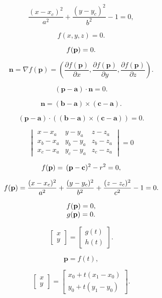 \documentclass[lang=cn,12pt]{elegantbook}
\begin{document}
$$
  {\frac{(x-x_{c})^{2}}{a^{2}}}+{\frac{(y-y_{c})^{2}}{b^{2}}}-1=0,
$$

$$
  f(x,y,z)=0.
$$

$$
  f({\bf p})=0.
$$

$$
  \mathbf{n}=\nabla f(\mathbf{p})=\left({\frac{\partial f(\mathbf{p})}{\partial x}},{\frac{\partial f(\mathbf{p})}{\partial y}},{\frac{\partial f(\mathbf{p})}{\partial z}}\right).
$$

\begin{equation}
  (\mathbf{p}-\mathbf{a})\cdot\mathbf{n}=0.
\end{equation}

$$
  \mathbf{n}=(\mathbf{b}-\mathbf{a})\times(\mathbf{c}-\mathbf{a}).
$$

\begin{equation}
  (\mathbf{p}-\mathbf{a})\cdot((\mathbf{b}-\mathbf{a})\times(\mathbf{c}-\mathbf{a}))=0.
\end{equation}

\begin{equation}
  \begin{vmatrix}
    x-x_a   & y-y_a   & z-z_a   \\
    x_b-x_a & y_b-y_a & z_b-z_a \\
    x_c-x_a & y_c-y_a & z_c-z_a
  \end{vmatrix}=0
\end{equation}

$$
  f({\bf p})=\,({\bf p}-{\bf c})^{2}-r^{2}=0,
$$

$$
  f({\bf p})=\frac{(x-x_{c})^{2}}{a^{2}}+\frac{(y-y_{c})^{2}}{b^{2}}+\frac{(z-z_{c})^{2}}{c^{2}}-1=0.
$$

$$
  \begin{array}{c l c r}{{f({\bf p})=0,}}\\ {{g({\bf p})=0.}}\end{array}
$$

$$
  \begin{bmatrix}
    x \\
    y
  \end{bmatrix}=
  \begin{bmatrix}
    g(t) \\
    h(t)
  \end{bmatrix}.
$$

$$
  \mathbf{p}=f(t),
$$

$$
  \begin{bmatrix}
    x \\
    y
  \end{bmatrix}=
  \begin{bmatrix}
    x_0+t(x_1-x_0) \\
    y_0+t(y_1-y_0)
  \end{bmatrix}.
$$
\end{document}
